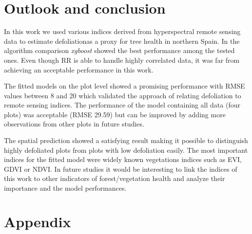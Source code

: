 \documentclass[review]{elsarticle}
\begin{document}


\section{Outlook and conclusion}

\noindent In this work we used various indices derived from hyperspectral remote sensing data to estimate defoliationas a proxy for tree health in northern Spain.
In the algorithm comparison \textit{xgboost} showed the best performance among the tested ones.
Even though \ac{RR} is able to handle highly correlated data, it was far from achieving an acceptable performance in this work.

The fitted models on the plot level showed a promising performance with RMSE values between 8 and 20 which validated the approach of relating defoliation to remote sensing indices.
The performance of the model containing all data (four plots) was acceptable (RMSE 29.59) but can be improved by adding more observations from other plots in future studies.

The spatial prediction showed a satisfying result making it possible to distinguish highly defoliated plots from plots with low defoliation easily.
The most important indices for the fitted model were widely known vegetations indices such as EVI, GDVI or NDVI.
In future studies it would be interesting to link the indices of this work to other indicators of forest/vegetation health and analyze their importance and the model performances.



\section{Appendix}

\appendix
\gdef\thesection{\Alph{section}} %
\makeatletter
\renewcommand\@seccntformat[1]{Appendix \csname the#1\endcsname.\hspace{0.5em}}
\makeatother
\end{document}
